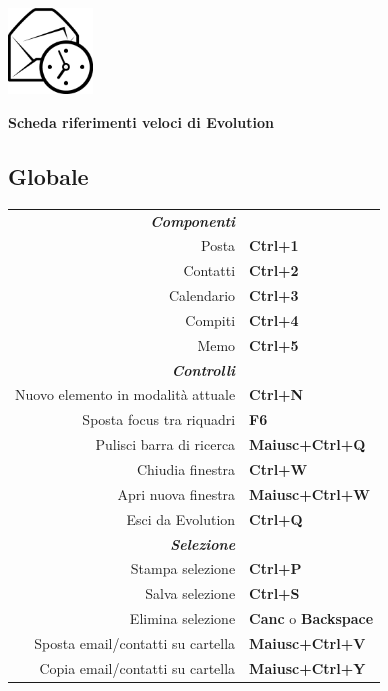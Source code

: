 \documentclass[12pt]{article}
\date {}
\begin{document}
	\begin{landscape}


	\begin{center}
	\begin{minipage}[m]
		{1in}\includegraphics[height=0.9in]{../evolution-logo.eps}\hspace{5mm}
	\end{minipage}
	\hspace{5mm}
	\textbf{\Huge{Scheda riferimenti veloci di Evolution}}
	\end{center}

	\begin{center}
	\begin{multicols}{2}
	\section*{Globale}
	\begin{tabular*}{4in}{rp{1.5in}}
		\textit{\textbf{Componenti}}		&					\\
		Posta					& \textbf{Ctrl+1}			\\
		Contatti				& \textbf{Ctrl+2}			\\
		Calendario				& \textbf{Ctrl+3}			\\
		Compiti					& \textbf{Ctrl+4}			\\
		\vspace{1.5mm}
		Memo					& \textbf{Ctrl+5}			\\
		\textit{\textbf{Controlli}}		&					\\
		Nuovo elemento in modalità attuale	& \textbf{Ctrl+N}			\\
		Sposta focus tra riquadri		& \textbf{F6}				\\
		Pulisci barra di ricerca		& \textbf{Maiusc+Ctrl+Q}			\\
		Chiudia finestra			& \textbf{Ctrl+W}			\\
		Apri nuova finestra			& \textbf{Maiusc+Ctrl+W}			\\
		\vspace{1.5mm}
		Esci da Evolution			& \textbf{Ctrl+Q}			\\
		\textit{\textbf{Selezione}}		&					\\
		Stampa selezione			& \textbf{Ctrl+P}			\\
		Salva selezione 			& \textbf{Ctrl+S}			\\
		Elimina selezione			& \textbf{Canc} o \textbf{Backspace}	\\
		Sposta email/contatti su cartella	& \textbf{Maiusc+Ctrl+V}			\\
		Copia email/contatti su cartella	& \textbf{Maiusc+Ctrl+Y}			\\
	\end{tabular*}

\end{multicols}
\end{center}
\end{landscape}
\end{document}
